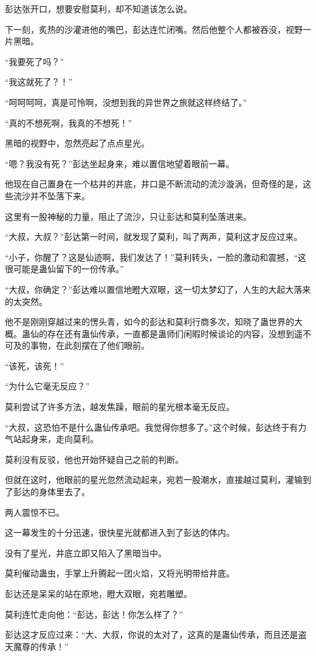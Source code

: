 \begin{this_body}
彭达张开口，想要安慰莫利，却不知道该怎么说。

下一刻，炙热的沙灌进他的嘴巴，彭达连忙闭嘴。然后他整个人都被吞没，视野一片黑暗。

“我要死了吗？”

“我这就死了？！”

“呵呵呵呵，真是可怜啊，没想到我的异世界之旅就这样终结了。”

“真的不想死啊，我真的不想死！”

黑暗的视野中，忽然亮起了点点星光。

“嗯？我没有死？”彭达坐起身来，难以置信地望着眼前一幕。

他现在自己置身在一个枯井的井底，井口是不断流动的流沙漩涡，但奇怪的是，这些流沙并不坠落下来。

这里有一股神秘的力量，阻止了流沙，只让彭达和莫利坠落进来。

“大叔，大叔？”彭达第一时间，就发现了莫利，叫了两声，莫利这才反应过来。

“小子，你醒了？这是仙迹啊，我们发达了！”莫利转头，一脸的激动和震撼，“这很可能是蛊仙留下的一份传承。”

“大叔，你确定？”彭达难以置信地瞪大双眼，这一切太梦幻了，人生的大起大落来的太突然。

他不是刚刚穿越过来的愣头青，如今的彭达和莫利行商多次，知晓了蛊世界的大概。蛊仙的存在还有蛊仙传承，一直都是蛊师们闲暇时候谈论的内容，没想到遥不可及的事物，在此刻摆在了他们眼前。

“该死，该死！”

“为什么它毫无反应？”

莫利尝试了许多方法，越发焦躁，眼前的星光根本毫无反应。

“大叔，这恐怕不是什么蛊仙传承吧。我觉得你想多了。”这个时候，彭达终于有力气站起身来，走向莫利。

莫利没有反驳，他也开始怀疑自己之前的判断。

但就在这时，他眼前的星光忽然流动起来，宛若一股潮水，直接越过莫利，灌输到了彭达的身体里去了。

两人震惊不已。

这一幕发生的十分迅速，很快星光就都进入到了彭达的体内。

没有了星光，井底立即又陷入了黑暗当中。

莫利催动蛊虫，手掌上升腾起一团火焰，又将光明带给井底。

彭达还是呆呆的站在原地，瞪大双眼，宛若雕塑。

莫利连忙走向他：“彭达，彭达！你怎么样了？”

彭达这才反应过来：“大、大叔，你说的太对了，这真的是蛊仙传承，而且还是盗天魔尊的传承！”


\end{this_body}
